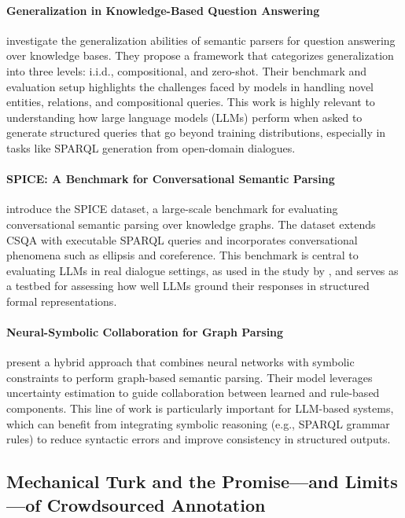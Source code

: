 \paragraph{Generalization in Knowledge-Based Question Answering}
\citet{gu2021beyond} investigate the generalization abilities of semantic parsers for question answering over knowledge bases. They propose a framework that categorizes generalization into three levels: i.i.d., compositional, and zero-shot. Their benchmark and evaluation setup highlights the challenges faced by models in handling novel entities, relations, and compositional queries. This work is highly relevant to understanding how large language models (LLMs) perform when asked to generate structured queries that go beyond training distributions, especially in tasks like SPARQL generation from open-domain dialogues.

\paragraph{SPICE: A Benchmark for Conversational Semantic Parsing}
\citet{perezbeltrachini2023semantic} introduce the SPICE dataset, a large-scale benchmark for evaluating conversational semantic parsing over knowledge graphs. The dataset extends CSQA with executable SPARQL queries and incorporates conversational phenomena such as ellipsis and coreference. This benchmark is central to evaluating LLMs in real dialogue settings, as used in the study by \citet{schneider2023llmsp}, and serves as a testbed for assessing how well LLMs ground their responses in structured formal representations.

\paragraph{Neural-Symbolic Collaboration for Graph Parsing}
\citet{lin2022collaborative} present a hybrid approach that combines neural networks with symbolic constraints to perform graph-based semantic parsing. Their model leverages uncertainty estimation to guide collaboration between learned and rule-based components. This line of work is particularly important for LLM-based systems, which can benefit from integrating symbolic reasoning (e.g., SPARQL grammar rules) to reduce syntactic errors and improve consistency in structured outputs.


\subsection{Mechanical Turk and the Promise—and Limits—of Crowdsourced Annotation}

